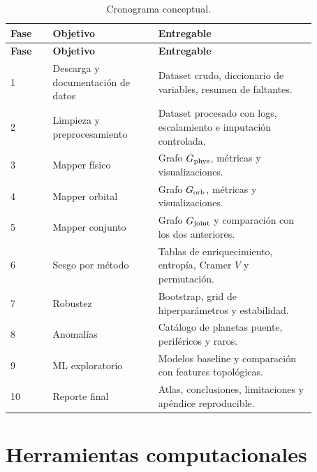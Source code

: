 \documentclass[11pt,letterpaper]{article}
\newcommand{\phys}{\rm phys}
\newcommand{\orb}{\rm orb}
\newcommand{\joint}{\rm joint}
\begin{document}
\begin{longtable}{p{0.12\linewidth}p{0.30\linewidth}p{0.45\linewidth}}
\caption{Cronograma conceptual.}\\
\toprule
\textbf{Fase} & \textbf{Objetivo} & \textbf{Entregable} \\
\midrule
\endfirsthead
\toprule
\textbf{Fase} & \textbf{Objetivo} & \textbf{Entregable} \\
\midrule
\endhead
1 & Descarga y documentación de datos & Dataset crudo, diccionario de variables, resumen de faltantes. \\
2 & Limpieza y preprocesamiento & Dataset procesado con logs, escalamiento e imputación controlada. \\
3 & Mapper físico & Grafo $G_{\phys}$, métricas y visualizaciones. \\
4 & Mapper orbital & Grafo $G_{\orb}$, métricas y visualizaciones. \\
5 & Mapper conjunto & Grafo $G_{\joint}$ y comparación con los dos anteriores. \\
6 & Sesgo por método & Tablas de enriquecimiento, entropía, Cramer $V$ y permutación. \\
7 & Robustez & Bootstrap, grid de hiperparámetros y estabilidad. \\
8 & Anomalías & Catálogo de planetas puente, periféricos y raros. \\
9 & ML exploratorio & Modelos baseline y comparación con features topológicas. \\
10 & Reporte final & Atlas, conclusiones, limitaciones y apéndice reproducible. \\
\bottomrule
\end{longtable}

\section{Herramientas computacionales}
\end{document}
